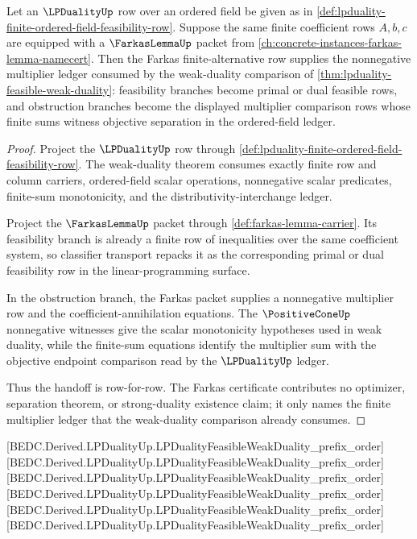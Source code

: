 \begin{theorem}
\label{thm:lpduality-farkas-alternative-handoff}
Let an $\LPDualityUp$ row over an ordered field be given as in \autoref{def:lpduality-finite-ordered-field-feasibility-row}. Suppose the same finite coefficient rows $A,b,c$ are equipped with a $\FarkasLemmaUp$ packet from \autoref{ch:concrete-instances-farkas-lemma-namecert}. Then the Farkas finite-alternative row supplies the nonnegative multiplier ledger consumed by the weak-duality comparison of \autoref{thm:lpduality-feasible-weak-duality}: feasibility branches become primal or dual feasible rows, and obstruction branches become the displayed multiplier comparison rows whose finite sums witness objective separation in the ordered-field ledger.
\end{theorem}
\begin{proof}
Project the $\LPDualityUp$ row through \autoref{def:lpduality-finite-ordered-field-feasibility-row}. The weak-duality theorem consumes exactly finite row and column carriers, ordered-field scalar operations, nonnegative scalar predicates, finite-sum monotonicity, and the distributivity-interchange ledger.

Project the $\FarkasLemmaUp$ packet through \autoref{def:farkas-lemma-carrier}. Its feasibility branch is already a finite row of inequalities over the same coefficient system, so classifier transport repacks it as the corresponding primal or dual feasibility row in the linear-programming surface.

In the obstruction branch, the Farkas packet supplies a nonnegative multiplier row and the coefficient-annihilation equations. The $\PositiveConeUp$ nonnegative witnesses give the scalar monotonicity hypotheses used in weak duality, while the finite-sum equations identify the multiplier sum with the objective endpoint comparison read by the $\LPDualityUp$ ledger.

Thus the handoff is row-for-row. The Farkas certificate contributes no optimizer, separation theorem, or strong-duality existence claim; it only names the finite multiplier ledger that the weak-duality comparison already consumes.
\end{proof}



[BEDC.Derived.LPDualityUp.LPDualityFeasibleWeakDuality\_prefix\_order]
[BEDC.Derived.LPDualityUp.LPDualityFeasibleWeakDuality\_prefix\_order]
[BEDC.Derived.LPDualityUp.LPDualityFeasibleWeakDuality\_prefix\_order]
[BEDC.Derived.LPDualityUp.LPDualityFeasibleWeakDuality\_prefix\_order]
[BEDC.Derived.LPDualityUp.LPDualityFeasibleWeakDuality\_prefix\_order]
[BEDC.Derived.LPDualityUp.LPDualityFeasibleWeakDuality\_prefix\_order]

